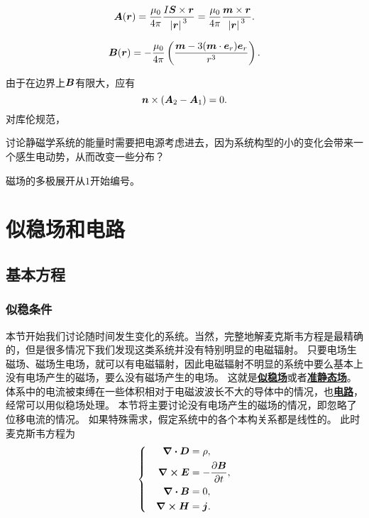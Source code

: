 \documentclass[UTF8, a4paper]{ctexart}
\newcommand*{\concept}[1]{\underline{\textbf{#1}}}
\newenvironment{bigcase}{\left\{\quad\begin{aligned}}{\end{aligned}\right.}
\begin{document}
\begin{equation}
    \vb*{A}(\vb*{r}) = \frac{\mu_0}{4\pi} \frac{I \vb*{S} \times \vb*{r}}{\abs*{\vb*{r}}^3} = \frac{\mu_0}{4\pi} \frac{\vb*{m} \times \vb*{r}}{\abs*{\vb*{r}}^3}.
\end{equation}

\begin{equation}
    \vb*{B}(\vb*{r}) = - \frac{\mu_0}{4\pi} \left( \frac{\vb*{m} - 3 (\vb*{m} \cdot \vb*{e}_r) \vb*{e}_r}{r^3} \right).
\end{equation}

由于在边界上$\vb*{B}$有限大，应有
\begin{equation}
    \vb*{n} \times (\vb*{A}_2 - \vb*{A}_1) = 0.
\end{equation}
对库伦规范，

讨论静磁学系统的能量时需要把电源考虑进去，因为系统构型的小的变化会带来一个感生电动势，从而改变一些分布？

磁场的多极展开从$1$开始编号。

\section{似稳场和电路}

\subsection{基本方程}

\subsubsection{似稳条件}

本节开始我们讨论随时间发生变化的系统。当然，完整地解麦克斯韦方程是最精确的，但是很多情况下我们发现这类系统并没有特别明显的电磁辐射。
只要电场生磁场、磁场生电场，就可以有电磁辐射，因此电磁辐射不明显的系统中要么基本上没有电场产生的磁场，要么没有磁场产生的电场。 %
这就是\concept{似稳场}或者\concept{准静态场}。体系中的电流被束缚在一些体积相对于电磁波波长不大的导体中的情况，也\concept{电路}，经常可以用似稳场处理。
本节将主要讨论没有电场产生的磁场的情况，即忽略了位移电流的情况。
如果特殊需求，假定系统中的各个本构关系都是线性的。
此时麦克斯韦方程为
\begin{equation}
    \begin{bigcase}
        \div{\vb*{D}} &= \rho, \\
        \curl{\vb*{E}} &= - \pdv{\vb*{B}}{t}, \\
        \div{\vb*{B}} &= 0, \\
        \curl{\vb*{H}} &= \vb*{j}.
    \end{bigcase}
    \label{eq:quasi-stable-field}
\end{equation}
\end{document}

